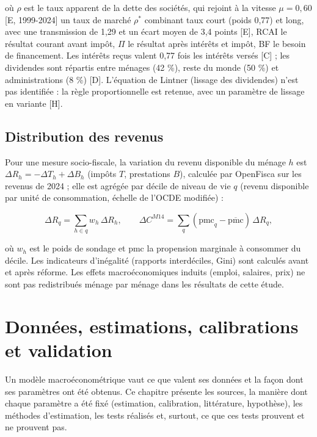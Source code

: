 \documentclass[
  11pt,
  11pt,
  a4paper,
  openany]{book}
\begin{document}
où \(\rho\) est le taux apparent de la dette des sociétés, qui rejoint à
la vitesse \(\mu = 0{,}60\) {[}E, 1999-2024{]} un taux de marché
\(\rho^*\) combinant taux court (poids 0,77) et long, avec une
transmission de 1,29 et un écart moyen de 3,4 points {[}E{]}, RCAI le
résultat courant avant impôt, \(\Pi\) le résultat après intérêts et
impôt, BF le besoin de financement. Les intérêts reçus valent 0,77 fois
les intérêts versés {[}C{]} ; les dividendes sont répartis entre ménages
(42 \%), reste du monde (50 \%) et administrations (8 \%) {[}D{]}.
L'équation de Lintner (lissage des dividendes) n'est pas identifiée : la
règle proportionnelle est retenue, avec un paramètre de lissage en
variante {[}H{]}.

\hypertarget{sec:eq-distribution}{%
\section{Distribution des revenus}\label{sec:eq-distribution}}

Pour une mesure socio-fiscale, la variation du revenu disponible du
ménage \(h\) est \(\Delta R_h = -\Delta T_h + \Delta B_h\) (impôts
\(T\), prestations \(B\)), calculée par OpenFisca sur les revenus de
2024 ; elle est agrégée par décile de niveau de vie \(q\) (revenu
disponible par unité de consommation, échelle de l'OCDE modifiée) :

\[\Delta R_q = \sum_{h \in q} w_h\,\Delta R_h, \qquad \Delta C^{M14} = \sum_q (\text{pmc}_q - \overline{\text{pmc}})\,\Delta R_q,\]

où \(w_h\) est le poids de sondage et pmc la propension marginale à
consommer du décile. Les indicateurs d'inégalité (rapports interdéciles,
Gini) sont calculés avant et après réforme. Les effets macroéconomiques
induits (emploi, salaires, prix) ne sont pas redistribués ménage par
ménage dans les résultats de cette étude.

\hypertarget{sec:donnees}{%
\chapter{Données, estimations, calibrations et
validation}\label{sec:donnees}}

Un modèle macroéconométrique vaut ce que valent ses données et la façon
dont ses paramètres ont été obtenus. Ce chapitre présente les sources,
la manière dont chaque paramètre a été fixé (estimation, calibration,
littérature, hypothèse), les méthodes d'estimation, les tests réalisés
et, surtout, ce que ces tests prouvent et ne prouvent pas.
\end{document}
